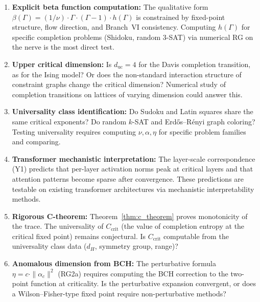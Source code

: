 \documentclass[11pt,letterpaper]{article}
\begin{document}
\begin{enumerate}
    \item \textbf{Explicit beta function computation:} The 
    qualitative form $\beta(\Gamma) = (1/\nu) \cdot \Gamma \cdot 
    (\Gamma - 1) \cdot h(\Gamma)$ is constrained by fixed-point 
    structure, flow direction, and Branch~VI consistency. Computing 
    $h(\Gamma)$ for specific completion problems (Shidoku, random 
    3-SAT) via numerical RG on the nerve is the most direct test.
    
    \item \textbf{Upper critical dimension:} Is 
    $d_{\mathrm{uc}} = 4$ for the Davis completion transition, as 
    for the Ising model? Or does the non-standard interaction 
    structure of constraint graphs change the critical dimension? 
    Numerical study of completion transitions on lattices of varying 
    dimension could answer this.
    
    \item \textbf{Universality class identification:} Do Sudoku and 
    Latin squares share the same critical exponents? Do random 
    $k$-SAT and Erd\H{o}s--R\'enyi graph coloring? Testing 
    universality requires computing $\nu, \alpha, \eta$ for 
    specific problem families and comparing.
    
    \item \textbf{Transformer mechanistic interpretation:} The 
    layer-scale correspondence (Y1) predicts that per-layer 
    activation norms peak at critical layers and that attention 
    patterns become sparse after convergence. These predictions are 
    testable on existing transformer architectures via 
    mechanistic interpretability methods.
    
    \item \textbf{Rigorous C-theorem:} 
    Theorem~\ref{thm:c_theorem} proves monotonicity of the trace. 
    The universality of $C_{\mathrm{crit}}$ (the value of 
    completion entropy at the critical fixed point) remains 
    conjectural. Is $C_{\mathrm{crit}}$ computable from the 
    universality class data ($d_H$, symmetry group, range)?
    
    \item \textbf{Anomalous dimension from BCH:} The perturbative 
    formula $\eta = c \cdot \|\alpha_c\|^2$ (RG2a) requires 
    computing the BCH correction to the two-point function at 
    criticality. Is the perturbative expansion convergent, or does 
    a Wilson--Fisher-type fixed point require non-perturbative 
    methods?
    

\end{enumerate}
\end{document}
